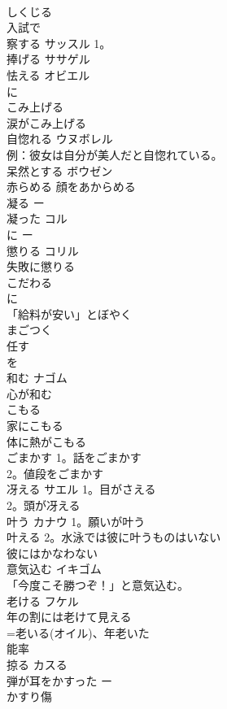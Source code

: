 \documentclass[8pt]{extreport}
\begin{document}
\begin{CJK}{UTF8}{min}
\\	しくじる	
\\	入試で
\\	察する	サッスル 1。
\\	捧げる	ササゲル 
\\	怯える	オビエル 
\\	に
\\	こみ上げる	
\\	涙がこみ上げる 
\\	自惚れる	ウヌボレル 
\\	例：彼女は自分が美人だと自惚れている。 
\\	呆然とする	ボウゼン 
\\	赤らめる	顔をあからめる 
\\	凝る ー
\\	凝った	コル 
\\	に ー
\\	懲りる	コリル 
\\	失敗に懲りる
\\	こだわる	
\\	に
\\	「給料が安い」とぼやく	
\\	まごつく	
\\	任す	
\\	を
\\	和む	ナゴム 
\\	心が和む 
\\	こもる	
\\	家にこもる 
\\	体に熱がこもる 
\\	ごまかす	1。話をごまかす 
\\	2。値段をごまかす 
\\	冴える	サエル 1。目がさえる　
\\	2。頭が冴える　
\\	叶う	カナウ 1。願いが叶う 
\\	叶える 2。水泳では彼に叶うものはいない　
\\	彼にはかなわない
\\	意気込む	イキゴム 
\\	「今度こそ勝つぞ！」と意気込む。
\\	老ける	フケル 
\\	年の割には老けて見える 
\\	=老いる(オイル)、年老いた
\\	能率	
\\	掠る	カスる 
\\	弾が耳をかすった ー
\\	かすり傷 

\end{CJK}
\end{document}
